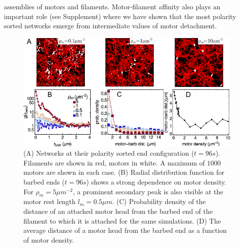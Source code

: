 \documentclass[12pt]{article}
\begin{document}
assemblies of motors and filaments. Motor-filament affinity also plays an 
important role (see Supplement) where we have shown that the most polarity 
sorted networks emerge from intermediate values of motor detachment. 
\begin{figure}[H] 
\centering
    \includegraphics[scale=1.2] {figs/polarity_sorting/ps_fig.pdf}
  \caption{%
  \label{fig:polarity_sorting}%
  (A) Networks at their polarity sorted end configuration ($t=96s$). 
  Filaments are shown in red, motors in white. A maximum of $1000$ motors are
  shown in each case.
 (B) Radial distribution function for barbed ends ($t=96s$) shows a strong 
 dependence on motor density. For $\rho_m=5\mu m^{-2}$, a prominent secondary 
 peak is also visible at the motor rest length $l_m=0.5\mu m$.
 (C) Probability density of the distance of an attached motor
   head from the barbed end of the filament to which it is attached for the same
   simulations.
 (D) The average distance of a motor head from the barbed end as a function of
 motor density.
 } 
 \end{figure}
\end{document}
